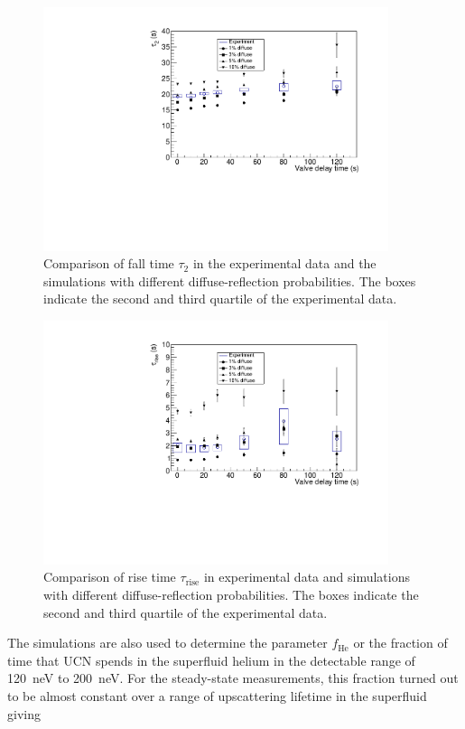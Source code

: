 \begin{figure}[h!]
  \centering \includegraphics[width=0.9\textwidth]{falltime.pdf}
  \caption{Comparison of fall time $\tau_2$ in the experimental data
    and the simulations with different diffuse-reflection
    probabilities. The boxes indicate the second and third quartile of
    the experimental data.}
\label{fig:falltime}
\end{figure}

\begin{figure}[h!]
\centering
\includegraphics[width=0.9\textwidth]{risetime.pdf}
\caption{Comparison of rise time $\tau_{\mathrm{rise}}$ in
  experimental data and simulations with different diffuse-reflection
  probabilities. The boxes indicate the second and third quartile of
  the experimental data.}
\label{fig:risetime}
\end{figure}

The simulations are also used to determine the parameter
$f_{\mathrm{He}}$ or the fraction of time that UCN spends in the
superfluid helium in the detectable range of 120~neV to 200~neV. For
the steady-state measurements, this fraction turned out to be almost
constant over a range of upscattering lifetime in the superfluid
giving

